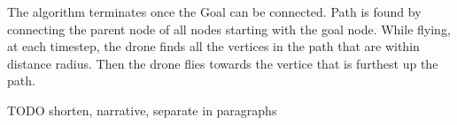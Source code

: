 The algorithm terminates once the Goal can be connected.
Path is found by connecting the parent node of all nodes starting with the goal node.
While flying, at each timestep, the drone finds all the vertices in the path that are within distance radius.
Then the drone flies towards the vertice that is furthest up the path.

TODO shorten, narrative, separate in paragraphs